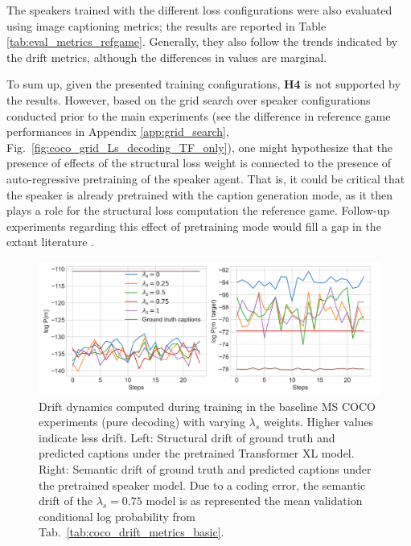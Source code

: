 The speakers trained with the different loss configurations were also evaluated using image captioning metrics; the results are reported in Table \ref{tab:eval_metrics_refgame}. Generally, they also follow the trends indicated by the drift metrics, although the differences in values are marginal.

To sum up, given the presented training configurations, \textbf{H4} is not supported by the results. However, based on the grid search over speaker configurations conducted prior to the main experiments (see the difference in reference game performances in Appendix \ref{app:grid_search}, Fig.~\ref{fig:coco_grid_Ls_decoding_TF_only}), one might hypothesize that the presence of effects of the structural loss weight is connected to the presence of auto-regressive pretraining of the speaker agent. That is, it could be critical that the speaker is already pretrained with the caption generation mode, as it then plays a role for the structural loss computation the reference game. Follow-up experiments regarding this effect of pretraining mode would fill a gap in the extant literature \parencite[but see][for related work]{lowe2020interaction}.

\begin{figure}
	\centering
	\includegraphics[width=\linewidth]{images/coco_structural_semantic_drift_4000_pure_L_S_all_random.png}
	\caption{Drift dynamics computed during training in the baseline MS COCO experiments (pure decoding) with varying $\lambda_s$ weights. Higher values indicate less drift. Left: Structural drift of ground truth and predicted captions under the pretrained Transformer XL model. Right: Semantic drift of ground truth and predicted captions under the pretrained speaker model. Due to a coding error, the semantic drift of the $\lambda_s = 0.75$ model is as represented the mean validation conditional log probability from Tab.~\ref{tab:coco_drift_metrics_basic}.}
	\label{fig:coco_baseline_str_sem_drift_all}
\end{figure}

